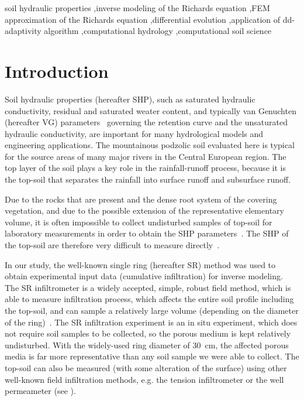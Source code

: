 \documentclass[review]{elsarticle}
\begin{document}
\begin{frontmatter}
\begin{keyword}
soil hydraulic properties \sep inverse modeling of the Richards equation \sep FEM approximation of the Richards equation \sep differential evolution \sep application of dd-adaptivity algorithm \sep computational hydrology \sep computational soil science


\end{keyword}

\end{frontmatter}

\linenumbers

\section{Introduction}%

Soil hydraulic properties (hereafter SHP), such as saturated hydraulic conductivity, residual and saturated weater content, and typically van Genuchten (hereafter VG) parameters~\citep{vangenuchten} governing the retention curve and the unsaturated hydraulic conductivity, are important for many hydrological models and engineering applications.  The mountainous podzolic soil evaluated here is typical for the source areas of many major rivers in the Central European region. The top layer of the soil plays a key role in the rainfall-runoff process, because it is the top-soil that separates the rainfall into surface runoff and subsurface runoff. 



Due to the rocks that are present and the dense root system of the covering vegetation, and due to the possible extension of the representative elementary volume, it is often impossible to collect undisturbed samples of top-soil for laboratory measurements in order to obtain the SHP parameters~\citep{Jacka1}. The SHP of the top-soil are therefore very difficult to measure directly~\citep{Fodor, Jacka1}. 


In our study, the well-known single ring (hereafter SR) method was used to obtain experimental input data (cumulative infiltration) for inverse modeling. The SR infiltrometer is a widely accepted, simple, robust field method, which is able to measure infiltration process, which affects the entire soil profile including the top-soil,  and can sample a relatively large volume (depending on the diameter of the ring)~\citep{Cheng,ReynoldsWD}.  The SR infiltration experiment is an in situ experiment, which does not require soil samples to be collected, so the porous medium is kept relatively undisturbed. With the widely-used ring diameter of 30~cm, the affected porous media is far more representative than any soil sample  we were able to collect. The top-soil can also be measured (with some alteration of the surface) using other well-known field infiltration methods, e.g. the tension infiltrometer or the well permeameter (see \citep{AnguloJaramillo,ReynoldsWDGP}). 
 
\end{document}
